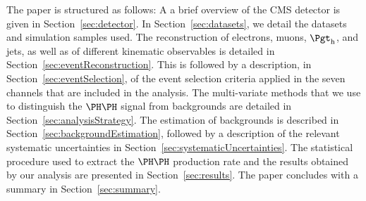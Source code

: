The paper is structured as follows:
A a brief overview of the CMS detector is given in Section~\ref{sec:detector}.
In Section~\ref{sec:datasets}, we detail the datasets and simulation samples used.
The reconstruction of electrons, muons, $\tauh$, and jets,
as well as of different kinematic observables is detailed in Section~\ref{sec:eventReconstruction}.
This is followed by a description, in Section~\ref{sec:eventSelection}, of the event selection criteria applied in the seven channels that are included in the analysis.
The multi-variate methods that we use to distinguish the $\PHiggs\PHiggs$ signal from backgrounds are detailed in Section~\ref{sec:analysisStrategy}.
The estimation of backgrounds is described in Section~\ref{sec:backgroundEstimation},
followed by a description of the relevant systematic uncertainties in Section~\ref{sec:systematicUncertainties}.
The statistical procedure used to extract the $\HH$ production rate and the results obtained by our analysis are presented in Section~\ref{sec:results}.
The paper concludes with a summary in Section~\ref{sec:summary}.
